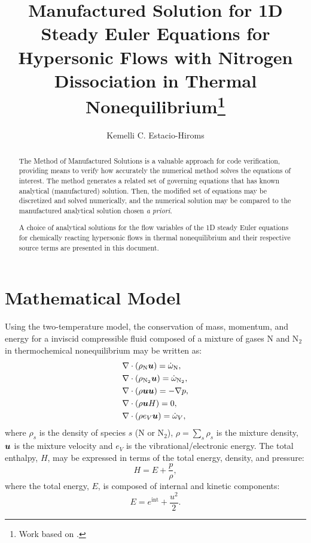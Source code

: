 \documentclass[10pt]{article}
\title{Manufactured Solution for 1D Steady Euler Equations for Hypersonic Flows with Nitrogen Dissociation in Thermal Nonequilibrium\footnote{Work based on \citet*{Kirk2009}.}}
\author{Kemelli C. Estacio-Hiroms}
\newcommand{\bv}[1]{\ensuremath{\mbox{\boldmath$ #1 $}}}
\begin{document}
\maketitle
\tableofcontents
\begin{abstract}
The Method of Manufactured Solutions is a valuable approach for code verification, providing means to verify how accurately the numerical method solves the equations of interest. The method generates a related set of governing equations that has known analytical (manufactured) solution. Then, the modified set of equations may be discretized and solved numerically, and the numerical solution may be compared to the manufactured analytical solution  chosen \textit{a priori}.

A choice of analytical solutions for the flow variables of the 1D steady Euler equations for chemically reacting hypersonic flows in thermal nonequilibrium  and their respective source terms are presented in this document.
\end{abstract}





\section{Mathematical Model}
Using the two-temperature model, the conservation of mass, momentum, and energy for a inviscid compressible fluid composed of a  mixture of gases N and N$_2$ in thermochemical nonequilibrium may be written as:
\begin{align}
\label{eq:euler:rhoN}
&\nabla \cdot \left(\rho_{\text{N}} \bv{u}\right) = \dot{\omega}_{\text{N}},\vspace{5pt} \\
 \label{eq:euler:rhoN2}
&\nabla \cdot \left(\rho_{\text{N}_2}\bv{u}\right) = \dot{\omega}_{\text{N}_2},\vspace{5pt}\\
\label{eq:euler:u}
&\nabla\cdot\left(\rho\bv{u}\bv{u}\right) = -\nabla p,\vspace{5pt} \\
\label{eq:euler:E}
&\nabla\cdot\left(\rho \bv{u} H\right) = 0,\vspace{5pt} \\
\label{eq:euler:eV}
&\nabla\cdot (\rho e_V \bv{u})= \dot{\omega}_V ,
\end{align}
%
where $\rho_s$ is the density of species $s$ (N or N$_2$), $\rho=\sum_s \rho_s$ is the mixture density,  $ \bv{u} $ is the mixture velocity and $e_V$ is  the vibrational/electronic energy. 
%
The total enthalpy, $H$, may be expressed in terms of the total energy, density, and pressure:
$$H = E + \dfrac{p}{\rho},$$
where the total energy, $E$, is composed of internal and kinetic components: $$E = e^{\text{int}} + \dfrac{ u^2 }{2}.$$ 
\end{document}
